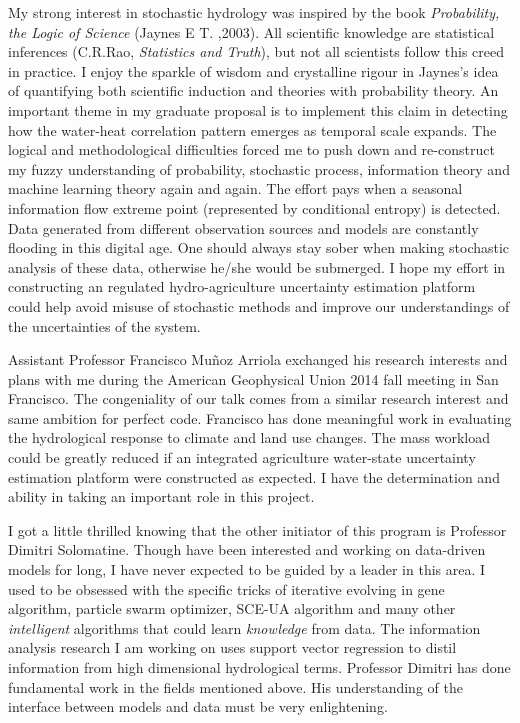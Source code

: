 \documentclass{article}
\begin{document}
{My strong interest in  stochastic hydrology was inspired by the book \emph{Probability, the Logic of Science} (Jaynes E T. ,2003). All scientific knowledge are statistical inferences (C.R.Rao, \emph{Statistics and Truth}), but not all scientists follow this creed in practice. I enjoy the sparkle of wisdom and crystalline rigour in Jaynes's  idea of quantifying  both scientific induction and theories with probability theory. An important theme in my graduate proposal is  to implement this claim in detecting how the water-heat correlation pattern emerges as temporal scale expands. The logical and methodological difficulties forced me to push down and re-construct my fuzzy understanding of probability, stochastic process, information theory and machine learning theory again and again. The effort pays when a seasonal information flow extreme point (represented by conditional entropy) is detected.  Data generated from different observation sources and models are constantly flooding   in this digital age. One should always stay sober when making stochastic analysis of these data, otherwise he/she would be submerged. I hope my effort in constructing an regulated hydro-agriculture uncertainty estimation platform could help avoid misuse of stochastic methods and improve our understandings of the uncertainties of the system.

Assistant Professor Francisco Muñoz Arriola exchanged his research interests and plans with me during the American Geophysical Union 2014 fall meeting in San Francisco. The congeniality of our talk comes from a similar research interest and same ambition for perfect code. Francisco has done meaningful work in evaluating the hydrological response to climate and land use changes. The mass workload could be greatly reduced if an integrated agriculture water-state uncertainty estimation platform were constructed as   expected. I have the determination and ability in taking an important role in this project.

I got a little thrilled knowing that the other initiator of this program is Professor Dimitri Solomatine. Though have been interested and working on data-driven models for long, I have never expected to be guided by a leader in this area. I used to be obsessed with the specific tricks of iterative evolving in  gene algorithm, particle swarm optimizer, SCE-UA algorithm and many other \emph{intelligent} algorithms that could learn \emph{knowledge} from data. The information analysis research I am working on uses support vector regression to distil information from high dimensional hydrological terms. Professor Dimitri has done fundamental work in the fields mentioned above. His understanding of the interface between models and data must be very enlightening.

}
\end{document}
